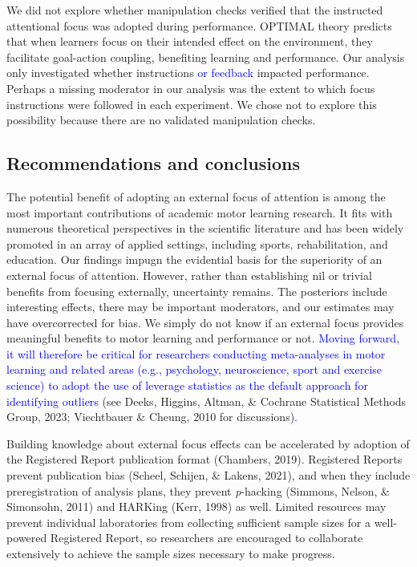 \documentclass[
  man, donotrepeattitle,floatsintext]{apa7}
\begin{document}
We did not explore whether manipulation checks verified that the instructed attentional focus was adopted during performance. OPTIMAL theory predicts that when learners focus on their intended effect on the environment, they facilitate goal-action coupling, benefiting learning and performance. Our analysis only investigated whether instructions \textcolor{blue}{or feedback} impacted performance. Perhaps a missing moderator in our analysis was the extent to which focus instructions were followed in each experiment. We chose not to explore this possibility because there are no validated manipulation checks.

\hypertarget{recommendations-and-conclusions}{%
\subsection{Recommendations and conclusions}\label{recommendations-and-conclusions}}

The potential benefit of adopting an external focus of attention is among the most important contributions of academic motor learning research. It fits with numerous theoretical perspectives in the scientific literature and has been widely promoted in an array of applied settings, including sports, rehabilitation, and education. Our findings impugn the evidential basis for the superiority of an external focus of attention. However, rather than establishing nil or trivial benefits from focusing externally, uncertainty remains. The posteriors include interesting effects, there may be important moderators, and our estimates may have overcorrected for bias. We simply do not know if an external focus provides meaningful benefits to motor learning and performance or not. \textcolor{blue}{Moving forward, it will therefore be critical for researchers conducting meta-analyses in motor learning and related areas (e.g., psychology, neuroscience, sport and exercise science) to adopt the use of leverage statistics as the default approach for identifying outliers} (see Deeks, Higgins, Altman, \& Cochrane Statistical Methods Group, 2023; Viechtbauer \& Cheung, 2010 for discussions)\textcolor{blue}{.}

Building knowledge about external focus effects can be accelerated by adoption of the Registered Report publication format (Chambers, 2019). Registered Reports prevent publication bias (Scheel, Schijen, \& Lakens, 2021), and when they include preregistration of analysis plans, they prevent \emph{p}-hacking (Simmons, Nelson, \& Simonsohn, 2011) and HARKing (Kerr, 1998) as well. Limited resources may prevent individual laboratories from collecting sufficient sample sizes for a well-powered Registered Report, so researchers are encouraged to collaborate extensively to achieve the sample sizes necessary to make progress.
\end{document}
